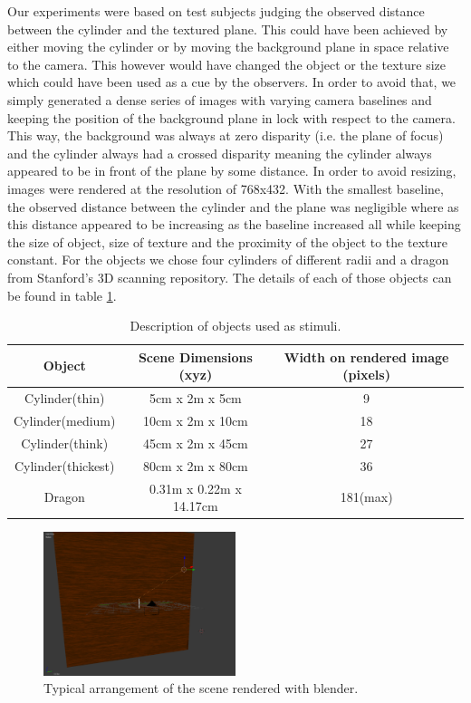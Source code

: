 Our experiments were based on test subjects judging the observed distance between the cylinder and the textured plane. This could have been achieved by either moving the cylinder or by moving the background plane in space relative to the camera. This however would have changed the object or the texture size which could have been used as a cue by the observers. In order to avoid that, we simply generated a dense series of images with varying camera baselines and keeping the position of the background plane in lock with respect to the camera. This way, the background was always at zero disparity (i.e. the plane of focus) and the cylinder always had a crossed disparity meaning the cylinder always appeared to be in front of the plane by some distance. In order to avoid resizing, images were rendered at the resolution of 768x432. With the smallest baseline, the observed distance between the cylinder and the plane was negligible where as this distance appeared to be increasing as the baseline increased all while keeping the size of object, size of texture and the proximity of the object to the texture constant. For the objects we chose four cylinders of different radii and a dragon from Stanford's 3D scanning repository. The details of each of those objects can be found in table \ref{tab:stimili_desc}.
\begin{table}[h!]
  \begin{center}
    \caption{Description of objects used as stimuli.}
    \label{tab:stimili_desc}
    \begin{tabular}{ccc}
      \toprule
      Object & Scene Dimensions (xyz) & Width on rendered image (pixels)\\
      \midrule
      Cylinder(thin) & 5cm x 2m x 5cm & 9\\
      Cylinder(medium) & 10cm x 2m x 10cm & 18\\
      Cylinder(think) & 45cm x 2m x 45cm & 27\\
      Cylinder(thickest) & 80cm x 2m x 80cm & 36 \\
      Dragon & 0.31m x 0.22m x 14.17cm & 181(max) \\
      \bottomrule
    \end{tabular}
  \end{center}
\end{table}
\begin{figure}
\centering
    \includegraphics[width=0.5\textwidth]{./Template_Figures/blender_scene}
    \caption{Typical arrangement of the scene rendered with blender.\label{fig:blender_scene}}
\end{figure}

